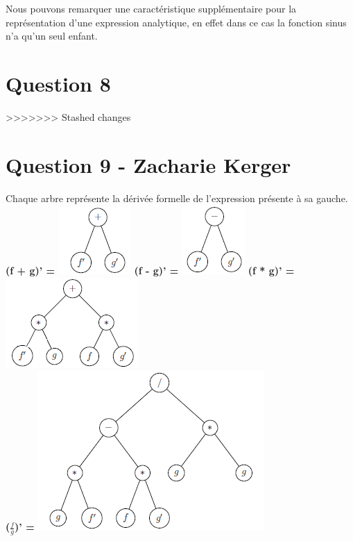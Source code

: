 \documentclass[10pt,a4paper]{article}
\begin{document}
Nous pouvons remarquer une caractéristique supplémentaire pour la représentation d'une expression analytique, en effet dans ce cas la fonction sinus n'a qu'un seul enfant.

\section*{Question 8}
>>>>>>> Stashed changes
\clearpage
\section*{Question 9 - Zacharie Kerger}

Chaque arbre représente la dérivée formelle de l'expression présente à sa gauche.\\

\textbf{(f + g)' =} \includegraphics[scale=1]{q9-f+g.png}
\textbf{(f - g)' =} \includegraphics[scale=1]{q9-f-g.png}
\textbf{(f * g)' =} \includegraphics[scale=1]{q9-fg.png} \\
\textbf{($\frac{f}{g}$)' =} \includegraphics[scale=1]{q9-fdivg.png}
\end{document}
